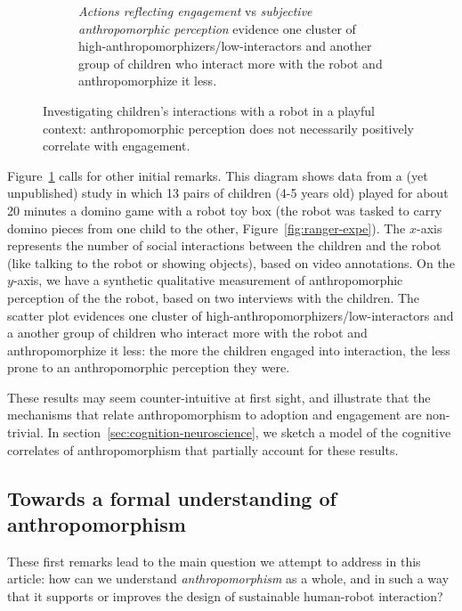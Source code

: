 \documentclass{frontiersSCNS} %
\begin{document}
\begin{figure}[b]
\begin{subfigure}[b]{0.48\columnwidth}
            \caption{\emph{Actions reflecting engagement} vs \textit{subjective anthropomorphic
                perception} evidence one cluster of
                high-anthropomorphizers/low-interactors and another group of children who
                interact more with the robot and anthropomorphize it less.}
            \label{fig:qualitative-score}
        \end{subfigure}
        \caption{Investigating children's interactions with a robot in a playful
            context: anthropomorphic perception does not necessarily positively
            correlate with engagement.}
    \label{fig:ranger}
\end{figure}


Figure~\ref{fig:qualitative-score} calls for other initial remarks. This diagram
shows data from a (yet unpublished) study in which 13 pairs of children (4-5
years old) played for about 20 minutes a domino game with a robot toy box (the
robot was tasked to carry domino pieces from one child to the other,
Figure~\ref{fig:ranger-expe}).  The $x$-axis represents the number of social
interactions between the children and the robot (like talking to the robot or
showing objects), based on video annotations. On the $y$-axis, we have a
synthetic qualitative measurement of anthropomorphic perception of the the
robot, based on two interviews with the children. The scatter plot evidences one
cluster of high-anthropomorphizers/low-interactors and a another group of
children who interact more with the robot and anthropomorphize it less: the
more the children engaged into interaction, the less prone to an anthropomorphic
perception they were.

These results may seem counter-intuitive at first sight, and illustrate that the
mechanisms that relate anthropomorphism to adoption and engagement are
non-trivial. In section~\ref{sec:cognition-neuroscience}, we sketch a model of
the cognitive correlates of anthropomorphism that partially account for these
results.


\subsection{Towards a formal understanding of anthropomorphism}

These first remarks lead to the main question we attempt to address in this
article: how can we understand \emph{anthropomorphism} as a whole, and in such a
way that it supports or improves the design of sustainable human-robot interaction?
\end{document}
